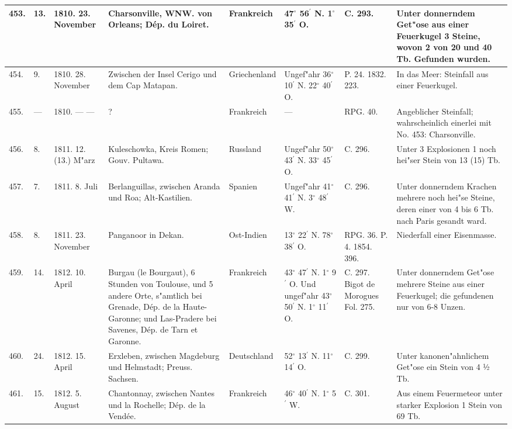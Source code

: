 \documentclass[a4paper, 8pt, oneside, polutonikogreek, german]{article}
\begin{document}
\begin{center}
\begin{longtable}{| p{5mm} | p{3mm} | p{15mm} | p{25mm} | p{20mm} | p{14mm} | p{17mm} | p{24mm} |}
        453. & 13. & 1810. 23. November & Charsonville, WNW. von Orleans; Dép. du Loiret. & Frankreich & 47$^\circ$ 56$^\prime$ N. 1$^\circ$ 35$^\prime$ O. & C. 293. & Unter donnerndem Get"ose aus einer Feuerkugel 3 Steine, wovon 2 von 20 und 40 Tb. Gefunden wurden. \\ \hline
        454. & 9. & 1810. 28. November & Zwischen der Insel Cerigo und dem Cap Matapan. & Griechenland & Ungef"ahr 36$^\circ$ 10$^\prime$ N. 22$^\circ$ 40$^\prime$ O. & P. 24. 1832. 223. & In das Meer: Steinfall aus einer Feuerkugel. \\ \hline
        455. & --- & 1810. --- --- & ? & Frankreich & --- & RPG. 40. & Angeblicher Steinfall; wahrscheinlich einerlei mit No. 453: Charsonville. \\ \hline
        456. & 8. & 1811. 12. (13.) M"arz & Kuleschowka, Kreis Romen; Gouv. Pultawa. & Russland & Ungef"ahr 50$^\circ$ 43$^\prime$ N. 33$^\circ$ 45$^\prime$ O. & C. 296. & Unter 3 Explosionen 1 noch hei"ser Stein von 13 (15) Tb. \\ \hline
        457. & 7. & 1811. 8. Juli & Berlanguillas, zwischen Aranda und Roa; Alt-Kastilien. & Spanien & Ungef"ahr 41$^\circ$ 41$^\prime$ N. 3$^\circ$ 48$^\prime$ W. & C. 296. & Unter donnerndem Krachen mehrere noch hei"se Steine, deren einer von 4 bis 6 Tb. nach Paris gesandt ward. \\ \hline
        458. & 8. & 1811. 23. November & Panganoor in Dekan. & Ost-Indien & 13$^\circ$ 22$^\prime$ N. 78$^\circ$ 38$^\prime$ O. & RPG. 36. P. 4. 1854. 396. & Niederfall einer Eisenmasse. \\ \hline
        459. & 14. & 1812. 10. April & Burgau (le Bourgaut), 6 Stunden von Toulouse, und 5 andere Orte, s"amtlich bei Grenade, Dép. de la Haute-Garonne; und Las-Pradere bei Savenes, Dép. de Tarn et Garonne. & Frankreich & 43$^\circ$ 47$^\prime$ N. 1$^\circ$ 9$^\prime$ O. Und ungef"ahr 43$^\circ$ 50$^\prime$ N. 1$^\circ$ 11$^\prime$ O. & C. 297. Bigot de Morogues Fol. 275. & Unter donnerndem Get"ose mehrere Steine aus einer Feuerkugel; die gefundenen nur von 6-8 Unzen. \\ \hline
        460. & 24. & 1812. 15. April & Erxleben, zwischen Magdeburg und Helmstadt; Preuss. Sachsen. & Deutschland & 52$^\circ$ 13$^\prime$ N. 11$^\circ$ 14$^\prime$ O. & C. 299. & Unter kanonen"ahnlichem Get"ose ein Stein von 4 ½ Tb. \\ \hline
        461. & 15. & 1812. 5. August & Chantonnay, zwischen Nantes und la Rochelle; Dép. de la Vendée. & Frankreich & 46$^\circ$ 40$^\prime$ N. 1$^\circ$ 5$^\prime$ W. & C. 301. & Aus einem Feuermeteor unter starker Explosion 1 Stein von 69 Tb. \\ \hline

\end{longtable}
\end{center}
\end{document}
